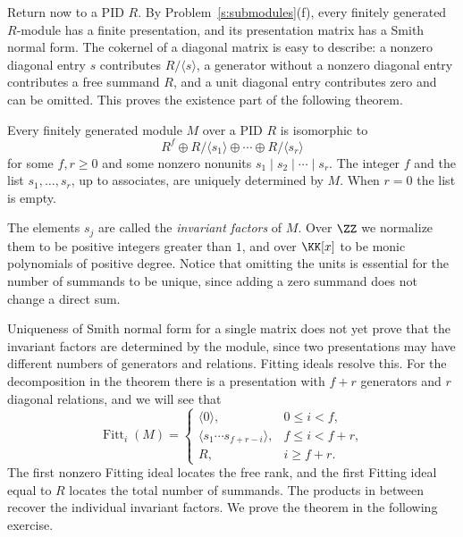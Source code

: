\documentclass[12pt,reqno]{amsart}
\DeclareMathOperator{\Fitt}{Fitt}
\begin{document}
\hrulefill

Return now to a PID $R$. By Problem~\ref{s:submodules}(f), every finitely generated $R$-module has a finite presentation, and its presentation matrix has a Smith normal form. The cokernel of a diagonal matrix is easy to describe: a nonzero diagonal entry $s$ contributes $R/\langle s\rangle$, a generator without a nonzero diagonal entry contributes a free summand $R$, and a unit diagonal entry contributes zero and can be omitted. This proves the existence part of the following theorem.

\begin{theorem}
Every finitely generated module $M$ over a PID $R$ is isomorphic to
\[
R^f\oplus R/\langle s_1\rangle\oplus\cdots\oplus R/\langle s_r\rangle
\]
for some $f,r\geq0$ and some nonzero nonunits $s_1\mid s_2\mid\cdots\mid s_r$. The integer $f$ and the list $s_1,\ldots,s_r$, up to associates, are uniquely determined by $M$. When $r=0$ the list is empty.
\end{theorem}

The elements $s_j$ are called the \emph{invariant factors} of $M$. Over $\ZZ$ we normalize them to be positive integers greater than $1$, and over $\KK[x]$ to be monic polynomials of positive degree. Notice that omitting the units is essential for the number of summands to be unique, since adding a zero summand does not change a direct sum.

Uniqueness of Smith normal form for a single matrix does not yet prove that the invariant factors are determined by the module, since two presentations may have different numbers of generators and relations. Fitting ideals resolve this. For the decomposition in the theorem there is a presentation with $f+r$ generators and $r$ diagonal relations, and we will see that
\[
\Fitt_i(M)=
\begin{cases}
\langle0\rangle,&0\leq i<f,\\
\langle s_1\cdots s_{f+r-i}\rangle,&f\leq i<f+r,\\
R,&i\geq f+r.
\end{cases}
\]
The first nonzero Fitting ideal locates the free rank, and the first Fitting ideal equal to $R$ locates the total number of summands. The products in between recover the individual invariant factors. We prove the theorem in the following exercise.

\hrulefill
\end{document}
